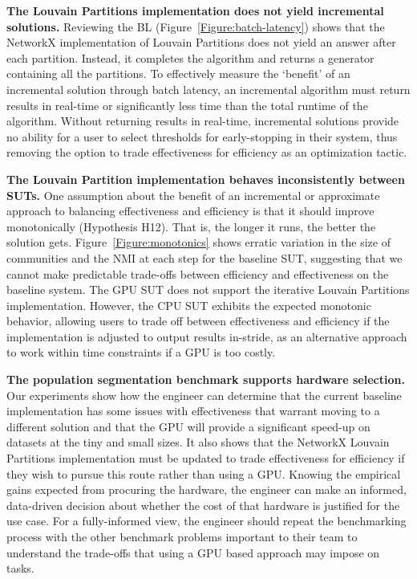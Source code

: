 \textbf{The Louvain Partitions implementation does not yield incremental solutions.}
Reviewing the \ac{BL} (Figure~\ref{Figure:batch-latency}) shows that the NetworkX implementation of Louvain Partitions does not yield an answer after each partition.
Instead, it completes the algorithm and returns a generator containing all the partitions.
To effectively measure the `benefit' of an incremental solution through batch latency, an incremental algorithm must return results in real-time or significantly less time than the total runtime of the algorithm.
Without returning results in real-time, incremental solutions provide no ability for a user to select thresholds for early-stopping in their system, thus removing the option to trade effectiveness for efficiency as an optimization tactic. 

\textbf{The Louvain Partition implementation behaves inconsistently between \ac{SUT}s.}
One assumption about the benefit of an incremental or approximate approach to balancing effectiveness and efficiency is that it should improve monotonically (Hypothesis H12).
That is, the longer it runs, the better the solution gets. 
Figure~\ref{Figure:monotonics} shows erratic variation in the size of communities and the NMI at each step for the baseline \ac{SUT}, suggesting that we cannot make predictable trade-offs between efficiency and effectiveness on the baseline system.
The \ac{GPU} \ac{SUT} does not support the iterative Louvain Partitions implementation. 
However, the \ac{CPU} \ac{SUT} exhibits the expected monotonic behavior, allowing users to trade off between effectiveness and efficiency if the implementation is adjusted to output results in-stride, as an alternative approach to work within time constraints if a \ac{GPU} is too costly.

\textbf{The population segmentation benchmark supports hardware selection.}
Our experiments show how the engineer can determine that the current baseline implementation has some issues with effectiveness that warrant moving to a different solution and that the \ac{GPU} will provide a significant speed-up on datasets at the tiny and small sizes.
It also shows that the NetworkX Louvain Partitions implementation must be updated to trade effectiveness for efficiency if they wish to pursue this route rather than using a \ac{GPU}.
Knowing the empirical gains expected from procuring the hardware, the engineer can make an informed, data-driven decision about whether the cost of that hardware is justified for the use case.
For a fully-informed view, the engineer should repeat the benchmarking process with the other \gai benchmark problems important to their team to understand the trade-offs that using a \ac{GPU} based approach may impose on \gai tasks.


